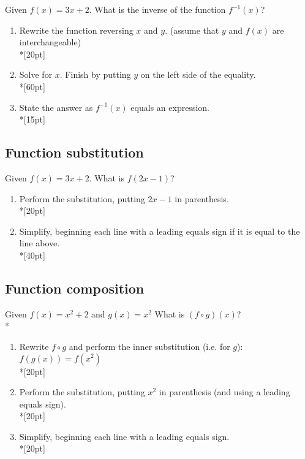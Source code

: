 

\item Given $f(x)=3x+2$. What is the inverse of the function $f^{-1} (x)$?

\begin{enumerate}
    \item Rewrite the function reversing $x$ and $y$. (assume that $y$ and $f(x)$ are interchangeable)\\*[20pt]
    \item Solve for $x$. Finish by putting $y$ on the left side of the equality.\\*[60pt]
    \item State the answer as $f^{-1} (x)$ equals an expression.\\*[15pt]
\end{enumerate}

\subsection*{Function substitution}
\item Given $f(x)=3x+2$. What is $f(2x-1)$?
\begin{enumerate}
    \item Perform the substitution, putting $2x-1$ in parenthesis.\\*[20pt]
    \item Simplify, beginning each line with a leading equals sign if it is equal to the line above.\\*[40pt]
\end{enumerate}

\subsection*{Function composition}
\item Given $f(x)=x^2+2$ and $g(x)=x^2$ What is $(f \circ g)(x)$?\\*
\begin{enumerate}
    \item Rewrite $f \circ g$ and perform the inner substitution (i.e. for $g$): $f(g(x))=f(x^2)$\\*[20pt]
    \item Perform the substitution, putting $x^2$ in parenthesis (and using a leading equals sign).\\*[20pt]
    \item Simplify, beginning each line with a leading equals sign.\\*[20pt]
\end{enumerate}